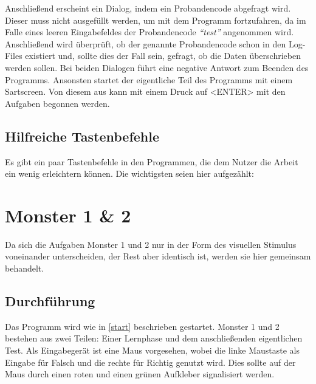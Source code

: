 \documentclass[a4paper]{scrartcl}
\newtheorem[M]{thmL}{Definition}
\begin{document}
Anschließend erscheint ein Dialog, indem ein Probandencode abgefragt wird. Dieser muss nicht ausgefüllt werden, um mit dem Programm fortzufahren, da im Falle eines leeren Eingabefeldes der Probandencode \emph{"`test"'} angenommen wird. Anschließend wird überprüft, ob der genannte Probandencode schon in den Log-Files existiert und, sollte dies der Fall sein, gefragt, ob die Daten überschrieben werden sollen. Bei beiden Dialogen führt eine negative Antwort zum Beenden des Programms. Ansonsten startet der eigentliche Teil des Programms mit einem Sartscreen. Von diesem aus kann mit einem Druck auf <ENTER> mit den Aufgaben begonnen werden.

\subsection{Hilfreiche Tastenbefehle}
Es gibt ein paar Tastenbefehle in den Programmen, die dem Nutzer die Arbeit ein wenig erleichtern können. Die wichtigsten seien hier aufgezählt:

\section{Monster 1 \& 2}
Da sich die Aufgaben Monster 1 und 2 nur in der Form des visuellen Stimulus voneinander unterscheiden, der Rest aber identisch ist, werden sie hier gemeinsam behandelt.

\subsection{Durchführung}\label{sub:dur}
Das Programm wird wie in \autoref{start} beschrieben gestartet. Monster 1 und 2 bestehen aus zwei Teilen: Einer Lernphase und dem anschließenden eigentlichen Test. Als Eingabegerät ist eine Maus vorgesehen, wobei die linke Maustaste als Eingabe für Falsch und die rechte für Richtig genutzt wird. Dies sollte auf der Maus durch einen roten und einen grünen Aufkleber signalisiert werden.
\end{document}
